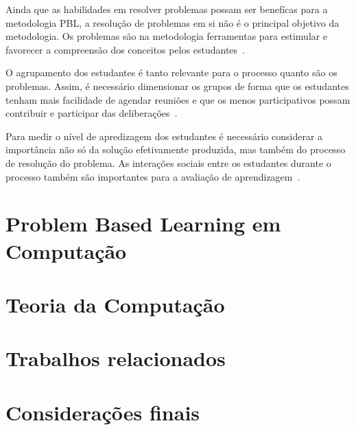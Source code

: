 


Ainda que as habilidades em resolver problemas possam ser benefícas
para a metodologia PBL, a resolução de problemas em si não é o
principal objetivo da metodologia.
Os problemas são na metodologia ferramentas para estimular e
favorecer a compreensão dos conceitos pelos
estudantes~\cite{wood2003problem,amos1998problem}.

O agrupamento dos estudantes é tanto relevante para o processo quanto
são os problemas. Assim, é necessário dimensionar os grupos de forma
que os estudantes tenham mais facilidade de agendar reuniões e que
os menos participativos possam contribuir e participar das
deliberações~\cite{albanese2010problem}.

Para medir o nível de apredizagem dos estudantes é necessário considerar
a importância não só da solução efetivamente produzida, mas também do
processo de resolução do problema.
As interações sociais entre os estudantes durante
o processo também são importantes para a
avaliação de aprendizagem~\cite{albanese2010problem}.


\section{Problem Based Learning em Computação}
\section{Teoria da Computação}
\section{Trabalhos relacionados}
\section{Considerações finais}
